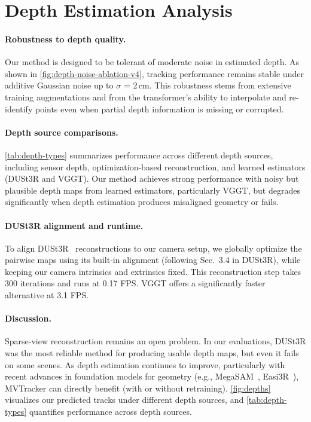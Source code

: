 \maketitlesupplementary
\appendix
\setcounter{page}{1}
\setcounter{table}{0}
\setcounter{figure}{0}
\setcounter{equation}{0}
\renewcommand{\thetable}{\thesection.\arabic{table}}
\renewcommand{\thefigure}{\thesection.\arabic{figure}}
\renewcommand{\theequation}{\thesection.\arabic{equation}}


\section{Depth Estimation Analysis}
\label{app:depth-analysis}
\paragraph{Robustness to depth quality.}
Our method is designed to be tolerant of moderate noise in estimated depth. As shown in \cref{fig:depth-noise-ablation-v4}, tracking performance remains stable under additive Gaussian noise up to $\sigma$ = 2\,cm. This robustness stems from extensive training augmentations and from the transformer’s ability to interpolate and re-identify points even when partial depth information is missing or corrupted. 

\paragraph{Depth source comparisons.}
\cref{tab:depth-types} summarizes performance across different depth sources, including sensor depth, optimization-based reconstruction, and learned estimators (DUSt3R and VGGT). Our method achieves strong performance with noisy but plausible depth maps from learned estimators, particularly VGGT, but degrades significantly when depth estimation produces misaligned geometry or fails.

\paragraph{DUSt3R alignment and runtime.}
To align DUSt3R~\cite{wang2024dust3r} reconstructions to our camera setup, we globally optimize the pairwise maps using its built-in alignment (following Sec.~3.4 in DUSt3R), while keeping our camera intrinsics and extrinsics fixed. This reconstruction step takes 300 iterations and runs at 0.17 FPS. VGGT offers a significantly faster alternative at 3.1 FPS.

\paragraph{Discussion.}
Sparse-view reconstruction remains an open problem. In our evaluations, DUSt3R was the most reliable method for producing usable depth maps, but even it fails on some scenes. As depth estimation continues to improve, particularly with recent advances in foundation models for geometry (e.g., MegaSAM~\cite{li2024_megasam}, Easi3R~\cite{chen2025easi3r}), MVTracker can directly benefit (with or without retraining). \cref{fig:depths} visualizes our predicted tracks under different depth sources, and \cref{tab:depth-types} quantifies performance across depth sources.

